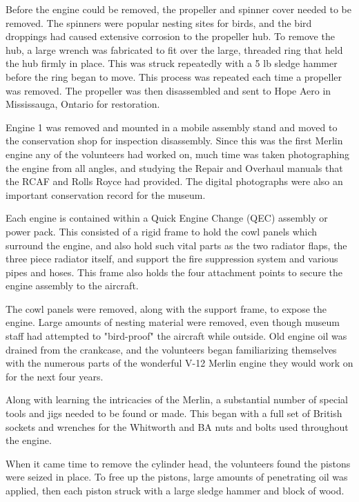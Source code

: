Before the engine could be removed, the propeller and spinner cover needed to
be removed.  The spinners were popular nesting sites for birds, and the bird
droppings had caused extensive corrosion to the propeller hub.  To remove the
hub, a large wrench was fabricated to fit over the large, threaded ring that
held the hub firmly in place.  This was struck repeatedly with a 5 lb sledge
hammer before the ring began to move.  This process was repeated each time a
propeller was removed.  The propeller was then disassembled and sent to Hope
Aero in Mississauga, Ontario for restoration.

Engine 1 was removed and mounted in a mobile assembly stand and moved to the
conservation shop for inspection disassembly. Since this was the first Merlin
engine any of the volunteers had worked on, much time was taken photographing
the engine from all angles, and studying the Repair and Overhaul manuals that
the RCAF and Rolls Royce had provided.  The digital photographs were also an
important conservation record for the museum.

Each engine is contained within a Quick Engine Change (QEC) assembly or power
pack. This consisted of a rigid frame to hold the cowl panels which surround
the engine, and also hold such vital parts as the two radiator flaps, the three
piece radiator itself, and support the fire suppression system and various
pipes and hoses.  This frame also holds the four attachment points to secure
the engine assembly to the aircraft.

The cowl panels were removed, along with the support frame, to expose the
engine.  Large amounts of nesting material were removed, even though museum
staff had attempted to "bird-proof" the aircraft while outside.  Old engine oil
was drained from the crankcase, and the volunteers began familiarizing
themselves with the numerous parts of the wonderful V-12 Merlin engine they
would work on for the next four years. 

Along with learning the intricacies of the Merlin, a substantial number of
special tools and jigs needed to be found or made.  This began with a full set
of British sockets and wrenches for the Whitworth and BA nuts and bolts used
throughout the engine.

When it came time to remove the cylinder head, the volunteers found the pistons
were seized in place. To free up the pistons, large amounts of penetrating oil
was applied, then each piston struck with a large sledge hammer and block of
wood.

